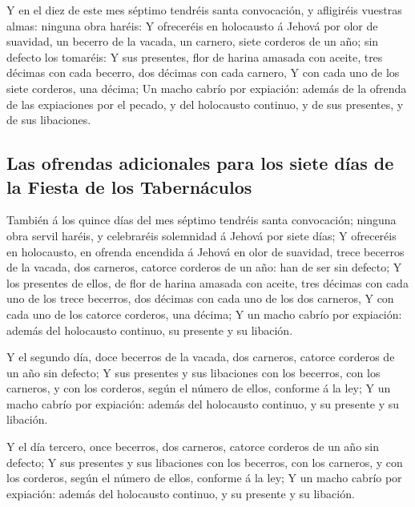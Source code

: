  Y en el diez de este mes séptimo tendréis santa
convocación, y afligiréis vuestras almas: ninguna obra haréis:
 Y ofreceréis en holocausto á Jehová por olor de suavidad,
un becerro de la vacada, un carnero, siete corderos de un año; sin
defecto los tomaréis:  Y sus presentes, flor de harina
amasada con aceite, tres décimas con cada becerro, dos décimas con cada
carnero,  Y con cada uno de los siete corderos, una
décima;  Un macho cabrío por expiación: además de la
ofrenda de las expiaciones por el pecado, y del holocausto continuo, y
de sus presentes, y de sus libaciones.

\hypertarget{las-ofrendas-adicionales-para-los-siete-duxedas-de-la-fiesta-de-los-tabernuxe1culos}{%
\subsection{Las ofrendas adicionales para los siete días de la Fiesta de
los
Tabernáculos}\label{las-ofrendas-adicionales-para-los-siete-duxedas-de-la-fiesta-de-los-tabernuxe1culos}}

 También á los quince días del mes séptimo tendréis santa
convocación; ninguna obra servil haréis, y celebraréis solemnidad á
Jehová por siete días;  Y ofreceréis en holocausto, en
ofrenda encendida á Jehová en olor de suavidad, trece becerros de la
vacada, dos carneros, catorce corderos de un año: han de ser sin
defecto;  Y los presentes de ellos, de flor de harina
amasada con aceite, tres décimas con cada uno de los trece becerros, dos
décimas con cada uno de los dos carneros,  Y con cada uno
de los catorce corderos, una décima;  Y un macho cabrío
por expiación: además del holocausto continuo, su presente y su
libación.

 Y el segundo día, doce becerros de la vacada, dos
carneros, catorce corderos de un año sin defecto;  Y sus
presentes y sus libaciones con los becerros, con los carneros, y con los
corderos, según el número de ellos, conforme á la ley;  Y
un macho cabrío por expiación: además del holocausto continuo, y su
presente y su libación.

 Y el día tercero, once becerros, dos carneros, catorce
corderos de un año sin defecto;  Y sus presentes y sus
libaciones con los becerros, con los carneros, y con los corderos, según
el número de ellos, conforme á la ley;  Y un macho cabrío
por expiación: además del holocausto continuo, y su presente y su
libación.

